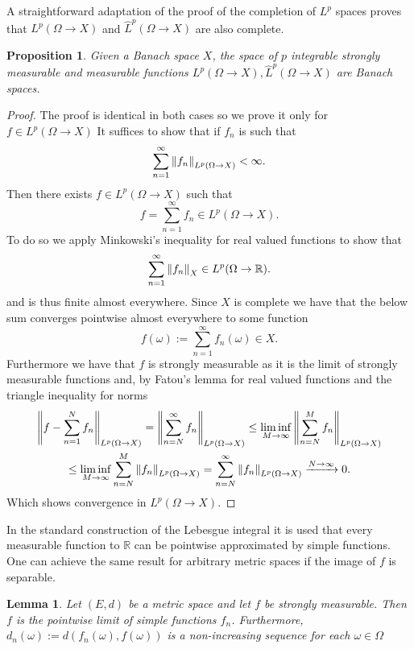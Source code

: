 \documentclass[12pt]{article}
\newtheorem{proposition}{Proposition}
\newtheorem{lemma}{Lemma}
\begin{document}
A straightforward adaptation of the proof of the completion of $L^p$ spaces proves that $L^p(\Omega\to X)$ and $\hat{L}^p(\Omega\to X)$ are also complete.
\begin{proposition}
	Given a Banach space $X$, the space of $p$ integrable strongly measurable and measurable functions $L^p(\Omega\to X),\hat{L}^p(\Omega\to X)$ are Banach spaces.
\end{proposition}
\begin{proof}
	The proof is identical in both cases so we prove it only for $f\in L^p(\Omega\to X)$
	It suffices to show that if $f_n$ is such that
	\begin{equation*}
		\sum_{n=1}^\infty \norm{f_n}_{L^p(\Omega\to X)}<\infty.
	\end{equation*}
	Then there exists $f\in L^p(\Omega\to X)$ such that
	\begin{equation*}
		f=\sum_{n=1}^\infty f_n\in L^p(\Omega\to X).
	\end{equation*}
	To do so we apply Minkowski's inequality for real valued functions to show that
	\begin{equation*}
		\sum_{n=1}^\infty \norm{f_n}_X\in L^p(\Omega\to{\mathbb R}).
	\end{equation*}
	and is thus finite almost everywhere. Since $X$ is complete we have that the below sum converges pointwise almost everywhere to some function
	\begin{equation*}
		f(\omega):=\sum_{n=1}^\infty f_n(\omega)\in X.
	\end{equation*}
	Furthermore we have that $f$ is strongly measurable as it is the limit of strongly measurable functions and, by Fatou's lemma for real valued functions and the triangle inequality for norms
	\begin{multline*}
		\norm{f-\sum_{n=1}^N f_n}_{L^p(\Omega\to X)}=\norm{\sum_{n=N}^\infty f_n}_{L^p(\Omega\to X)}\leq \liminf_{M\to \infty}\norm{\sum_{n=N}^M f_n}_{L^p(\Omega\to X)}\\\leq \liminf_{M\to \infty}\sum_{n=N}^M \norm{f_n}_{L^p(\Omega\to X)}=\sum_{n=N}^\infty \norm{f_n}_{L^p(\Omega\to X)}\xrightarrow{N\to\infty} 0.
	\end{multline*}
	Which shows convergence in $L^p(\Omega\to X)$.
\end{proof}
In the standard construction of the Lebesgue integral it is used that every measurable function to $\mathbb{R}$ can be pointwise approximated by simple functions. One can achieve the same result for arbitrary metric spaces if the image of $f$ is separable.
\begin{lemma}
	Let $(E,d)$ be a metric space and let $f$ be strongly measurable. Then $f$ is the pointwise limit of simple functions $f_n$. Furthermore, \\$d_n(\omega):=d(f_n(\omega),f(\omega))$ is a non-increasing sequence for each $\omega\in\Omega$
\end{lemma}
\end{document}
